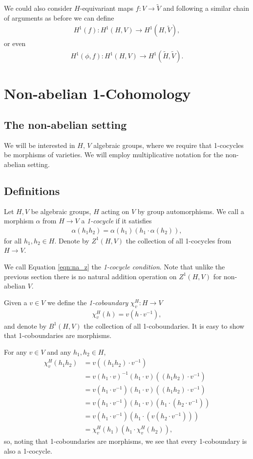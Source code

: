 We could also consider $H$-equivariant maps $f:V\rightarrow\tilde{V}$ and following a similar chain of arguments as before we can define
\begin{align*}
	H^1(f):H^1(H, V)\rightarrow H^1(H, \tilde{V}),
\end{align*}
or even	
\begin{align*}
	H^1(\phi, f):H^1(H, V)\rightarrow H^1(\tilde{H}, \tilde{V}).
\end{align*}
\section{Non-abelian 1-Cohomology}
	
\subsection{The non-abelian setting}

We will be interested in $H$, $V$ algebraic groups, where we require that 1-cocycles be morphisms of varieties. We will employ multiplicative notation for the non-abelian setting.

\subsection{Definitions}
Let $H, V$ be algebraic groups, $H$ acting on $V$ by group automorphisms. We call a morphism $\alpha$ from $H\rightarrow V$ a \emph{1-cocycle} if it satisfies
\begin{align}
  \alpha(h_1h_2) = \alpha(h_1) (h_1\cdot\alpha(h_2)),
  \label{eqn:na_z}
\end{align}
for all $h_1, h_2 \in H$. Denote by $Z^1\left( H, V \right)$ the collection of all 1-cocycles from $H\rightarrow V$.

We call Equation \ref{eqn:na_z} the \emph{1-cocycle condition}. Note that unlike the previous section there is no natural addition operation on $Z^1(H, V)$ for non-abelian $V$.

Given a $v \in V$ we define the \emph{1-coboundary} $\chi^H_v:H\rightarrow V$
\begin{align*}
	\chi^H_v (h) = v (h\cdot v^{-1}),
\end{align*}
and denote by $B^1\left(H, V\right)$ the collection of all 1-coboundaries. It is easy to show that 1-coboundaries are morphisms.

For any $v \in V$ and any $h_1, h_2 \in H$,
\begin{align*}
	\chi^H_v(h_1h_2) &=  v ((h_1h_2) \cdot v^{-1}) \\
	&=  v (h_1 \cdot v)^{-1} (h_1 \cdot v) ((h_1h_2) \cdot v^{-1}) \\
	&=  v (h_1 \cdot v^{-1}) (h_1 \cdot v) ((h_1h_2) \cdot v^{-1}) \\
	&=  v (h_1 \cdot v^{-1}) (h_1 \cdot v) (h_1 \cdot (h_2 \cdot v^{-1})) \\
	&=  v (h_1 \cdot v^{-1}) (h_1 \cdot (v (h_2 \cdot v^{-1}))) \\
	&=  \chi^H_v(h_1) (h_1 \cdot \chi^H_v(h_2)),
\end{align*}
so, noting that 1-coboundaries are morphisms, we see that every 1-coboundary is also a 1-cocycle. 

